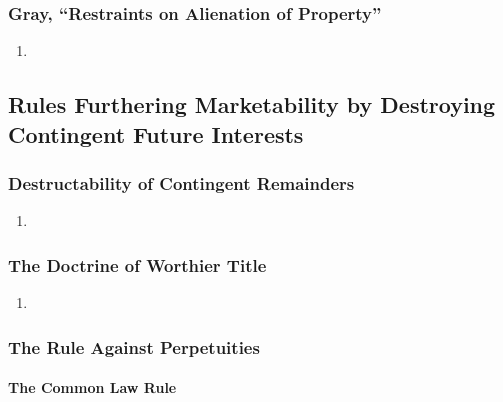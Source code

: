 \subsubsection{Gray, ``Restraints on Alienation of Property''}

\begin{enumerate}
    \item %
\end{enumerate}

\subsection{Rules Furthering Marketability by Destroying Contingent Future 
Interests}

\subsubsection{Destructability of Contingent Remainders}

\begin{enumerate}
    \item %
\end{enumerate}

\subsubsection{The Doctrine of Worthier Title}

\begin{enumerate}
    \item %
\end{enumerate}

\subsubsection{The Rule Against Perpetuities}

\paragraph{The Common Law Rule}

